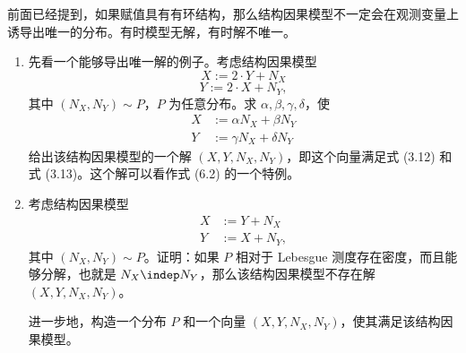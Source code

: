 \begin{problem}[有环结构因果模型]
前面已经提到，如果赋值具有有环结构，那么结构因果模型不一定会在观测变量上诱导出唯一的分布。有时模型无解，有时解不唯一。

\begin{enumerate}[label=\alph*)]
 \item 先看一个能够导出唯一解的例子。考虑结构因果模型
 \begin{equation}
 X:=2\cdot Y+N_X
 \tag{3.12}
 \end{equation}
 \begin{equation}
 Y:=2\cdot X+N_Y,
 \tag{3.13}
 \end{equation}
 其中 $(N_X,N_Y)\sim P$，$P$ 为任意分布。求 $\alpha,\beta,\gamma,\delta$，使
 \[
 \begin{aligned}
 X&:=\alpha N_X+\beta N_Y\\
 Y&:=\gamma N_X+\delta N_Y
 \end{aligned}
 \]
 给出该结构因果模型的一个解 $(X,Y,N_X,N_Y)$，即这个向量满足式 (3.12) 和式 (3.13)。这个解可以看作式 (6.2) 的一个特例。

 \item 考虑结构因果模型
 \[
 \begin{aligned}
 X&:=Y+N_X\\
 Y&:=X+N_Y,
 \end{aligned}
 \]
 其中 $(N_X,N_Y)\sim P$。证明：如果 $P$ 相对于 Lebesgue 测度存在密度，而且能够分解，也就是 $N_X\indep N_Y$，那么该结构因果模型不存在解 $(X,Y,N_X,N_Y)$。

 进一步地，构造一个分布 $P$ 和一个向量 $(X,Y,N_X,N_Y)$，使其满足该结构因果模型。
\end{enumerate}
\end{problem}
